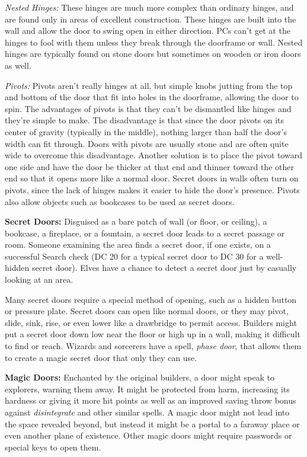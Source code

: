 \documentclass{article}
\begin{document}
\textit{Nested Hinges: }These hinges are much more complex than ordinary hinges, 
and are found only in areas of excellent construction. These hinges are built into 
the wall and allow the door to swing open in either direction. PCs can't get at 
the hinges to fool with them unless they break through the doorframe or wall. Nested 
hinges are typically found on stone doors but sometimes on wooden or iron doors 
as well. 

\textit{Pivots: }Pivots aren't really hinges at all, but simple knobs jutting from 
the top and bottom of the door that fit into holes in the doorframe, allowing the 
door to spin. The advantages of pivots is that they can't be dismantled like hinges 
and they're simple to make. The disadvantage is that since the door pivots on its 
center of gravity (typically in the middle), nothing larger than half the door's 
width can fit through. Doors with pivots are usually stone and are often quite 
wide to overcome this disadvantage. Another solution is to place the pivot toward 
one side and have the door be thicker at that end and thinner toward the other 
end so that it opens more like a normal door. Secret doors in walls often turn 
on pivots, since the lack of hinges makes it easier to hide the door's presence. 
Pivots also allow objects such as bookcases to be used as secret doors.

\textbf{Secret Doors:} Disguised as a bare patch of wall (or floor, or ceiling), 
a bookcase, a fireplace, or a fountain, a secret door leads to a secret passage 
or room. Someone examining the area finds a secret door, if one exists, on a successful 
Search check (DC 20 for a typical secret door to DC 30 for a well-hidden secret 
door). Elves have a chance to detect a secret door just by casually looking at 
an area.

Many secret doors require a special method of opening, such as a hidden button 
or pressure plate. Secret doors can open like normal doors, or they may pivot, 
slide, sink, rise, or even lower like a drawbridge to permit access. Builders might 
put a secret door down low near the floor or high up in a wall, making it difficult 
to find or reach. Wizards and sorcerers have a spell, \textit{phase door}, that 
allows them to create a magic secret door that only they can use.

\textbf{Magic Doors:} Enchanted by the original builders, a door might speak to 
explorers, warning them away. It might be protected from harm, increasing its hardness 
or giving it more hit points as well as an improved saving throw bonus against 
\textit{disintegrate }and other similar spells. A magic door might not lead into 
the space revealed beyond, but instead it might be a portal to a faraway place 
or even another plane of existence. Other magic doors might require passwords or 
special keys to open them. 
\end{document}
